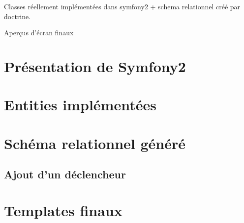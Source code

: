 Classes réellement implémentées dans symfony2 + schema relationnel créé par doctrine.

Aperçus d'écran finaux

\section{Présentation de Symfony2}

\section{Entities implémentées}

\section{Schéma relationnel généré}

\subsection{Ajout d'un déclencheur}


\section{Templates finaux}